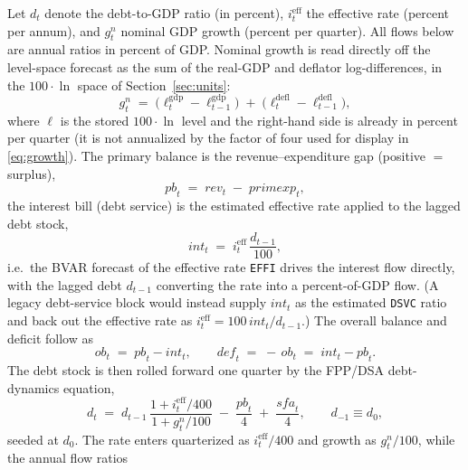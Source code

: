 \documentclass[11pt]{article}
\theoremstyle{definition}
\theoremstyle{remark}
\begin{document}
Let $d_t$ denote the debt-to-GDP ratio (in percent), $i^{\text{eff}}_t$
the effective rate (percent per annum), and $g^{n}_t$ nominal GDP growth
(percent per quarter).  All flows below are annual ratios in percent of
GDP.  Nominal growth is read directly off the level-space forecast as
the sum of the real-GDP and deflator log-differences, in the
$100\cdot\ln$ space of Section~\ref{sec:units}:
\begin{equation}\label{eq:fiscal_gn}
  g^{n}_t \;=\; \bigl(\ell^{\text{gdp}}_t - \ell^{\text{gdp}}_{t-1}\bigr)
            \;+\; \bigl(\ell^{\text{defl}}_t - \ell^{\text{defl}}_{t-1}\bigr),
\end{equation}
where $\ell$ is the stored $100\cdot\ln$ level and the right-hand side is
already in percent per quarter (it is not annualized by the factor of
four used for display in \eqref{eq:growth}).  The primary balance is the
revenue--expenditure gap (positive $=$ surplus),
\begin{equation}\label{eq:fiscal_pb}
  \mathit{pb}_t \;=\; \mathit{rev}_t \;-\; \mathit{primexp}_t,
\end{equation}
the interest bill (debt service) is the estimated effective rate applied to the
lagged debt stock,
\begin{equation}\label{eq:fiscal_int}
  \mathit{int}_t \;=\; i^{\text{eff}}_t\,\frac{d_{t-1}}{100},
\end{equation}
i.e.\ the BVAR forecast of the effective rate \texttt{EFFI} drives the interest
flow directly, with the lagged debt $d_{t-1}$ converting the rate into a
percent-of-GDP flow. (A legacy debt-service block would instead supply
$\mathit{int}_t$ as the estimated \texttt{DSVC} ratio and back out the effective
rate as $i^{\text{eff}}_t = 100\,\mathit{int}_t/d_{t-1}$.) The overall balance
and deficit follow as
\begin{equation}\label{eq:fiscal_bal}
  \mathit{ob}_t \;=\; \mathit{pb}_t - \mathit{int}_t,
  \qquad
  \mathit{def}_t \;=\; -\,\mathit{ob}_t \;=\; \mathit{int}_t - \mathit{pb}_t.
\end{equation}
The debt stock is then rolled forward one quarter by the
FPP/DSA debt-dynamics equation,
\begin{equation}\label{eq:fiscal_debt}
  d_t \;=\; d_{t-1}\,
       \frac{1 + i^{\text{eff}}_t/400}{1 + g^{n}_t/100}
       \;-\; \frac{\mathit{pb}_t}{4}
       \;+\; \frac{\mathit{sfa}_t}{4},
       \qquad d_{-1} \equiv d_0,
\end{equation}
seeded at $d_0$.  The rate enters quarterized as $i^{\text{eff}}_t/400$
and growth as $g^{n}_t/100$, while the annual flow ratios
\end{document}
